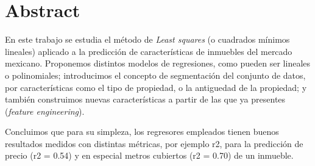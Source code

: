 \section{Abstract}

En este trabajo se estudia el método de \emph{Least squares} (o cuadrados mínimos lineales) aplicado a la predicción de características de inmuebles del mercado mexicano. Proponemos distintos modelos de regresiones, como pueden ser lineales o polinomiales; introducimos el concepto de segmentación del conjunto de datos, por características como el tipo de propiedad, o la antiguedad de la propiedad; y también construimos nuevas características a partir de las que ya presentes (\textit{feature engineering}).

Concluimos que para su simpleza, los regresores empleados tienen buenos resultados medidos con distintas métricas, por ejemplo r2, para la predicción de precio (r2 = 0.54) y en especial metros cubiertos (r2 = 0.70) de un inmueble.

